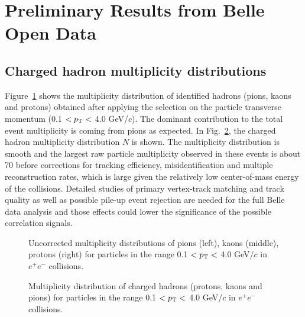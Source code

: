 \section{Preliminary Results from Belle Open Data}

\subsection{Charged hadron multiplicity distributions}

Figure~\ref{fig:multPID} shows the multiplicity distribution of identified hadrons (pions, kaons and protons) obtained after 
applying the selection on the particle transverse momentum (0.1 $<p_{\rm T}<$ 4.0 GeV/$c$). 
The dominant contribution to the total event multiplicity is coming from pions as expected.
In Fig.~\ref{fig:multHadron}, the charged hadron multiplicity distribution $N$ is shown. The multiplicity distribution is smooth and the largest raw particle multiplicity observed in these events is about 70 before corrections for tracking efficiency, misidentification and multiple reconstruction rates, which is large given the relatively low center-of-mass energy of the collisions. Detailed studies of primary vertex-track matching and track quality as well as possible pile-up event rejection are needed for the full Belle data analysis and those effects could lower the significance of the possible correlation signals.

\begin{figure}[!htb]
\begin{center}
\caption{Uncorrected multiplicity distributions of pions (left), kaons (middle), protons (right) for  particles in the range  0.1 $<p_{\rm T}<$ 4.0 GeV/$c$ in $e^{+}e^{-}$ collisions. }
\label{fig:multPID} 
\end{center}
\end{figure}

\begin{figure}[!htb]
\begin{center}
\caption{Multiplicity distribution of charged hadrons (protons, kaons and pions) for  particles in the range  0.1 $<p_{\rm T}<$ 4.0 GeV/$c$ in $e^{+}e^{-}$ collisions. }
\label{fig:multHadron} 
\end{center}
\end{figure}

